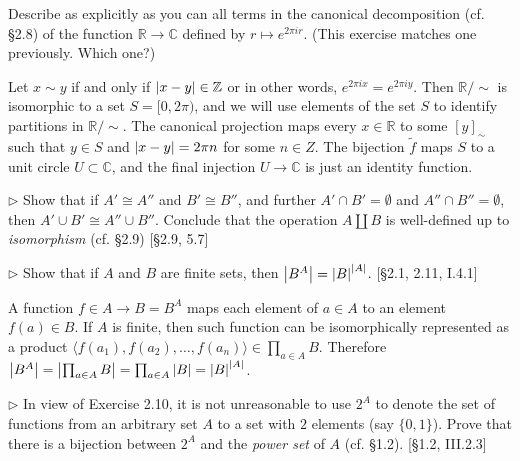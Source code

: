 \begin{problem}
  Describe as explicitly as you can all terms in the canonical decomposition
  (cf. \S2.8) of the function $\mathbb{R}\to\mathbb{C}$ defined by $r\mapsto
  e^{2\pi ir}$. (This exercise matches one previously. Which one?)
\end{problem}
\begin{solution}
  Let $x \sim y$ if and only if $\left|x-y\right| \in \mathbb{Z}$ or in other words,
  $e^{2\pi ix} = e^{2\pi iy}$. Then $\mathbb{R}/\sim$ is isomorphic to a set
  $S = [0, 2\pi)$, and we will use elements of the set $S$ to identify
  partitions in $\mathbb{R}/\sim$. The canonical projection maps every
  $x \in \mathbb{R}$ to some $[y]_{\sim}$ such that $y \in S$ and
  $\left|x-y\right| = 2 \pi n$ for some $n \in Z$. The bijection $\tilde{f}$ maps $S$ to
  a unit circle $U \subset \mathbb{C}$, and the final injection
  $U \to \mathbb{C}$ is just an identity function.
\end{solution}

\begin{problem}
  $\rhd$ Show that if $A'\cong A''$ and $B'\cong B''$, and further
  $A'\cap B'=\emptyset$ and $A''\cap B''=\emptyset$, then
  $A'\cup B'\cong A''\cup B''$. Conclude that the operation $A\amalg B$
  is well-defined up to \textit{isomorphism} (cf. \S2.9) [\S2.9, 5.7]
\end{problem}

\begin{problem}
  $\rhd$ Show that if $A$ and $B$ are finite sets, then $\left|B^A\right| =
  \left|B\right|^{\left|A\right|}$. [\S2.1, 2.11, I.4.1]
\end{problem}
\begin{solution}
  A function $f \in A \to B = B^A$ maps each element of $a \in A$ to
  an element $f(a) \in B$. If $A$ is finite, then such function can be
  isomorphically represented as a product $\langle f(a_1), f(a_2), \ldots,
  f(a_n)\rangle \in \prod_{a\in A} B$. Therefore $\left|B^A\right| =
  \left|\prod_{a\in A} B\right| = \prod_{a\in A}\left|B\right| = \left|B\right|^{\left|A\right|}$.
\end{solution}

\begin{problem}
  $\rhd$ In view of Exercise 2.10, it is not unreasonable to use $2^A$ to
  denote the set of functions from an arbitrary set $A$ to a set with $2$
  elements (say $\{0,1\}$). Prove that there is a bijection between $2^A$
  and the \textit{power set} of $A$ (cf. \S1.2). [\S1.2, III.2.3]
\end{problem}

